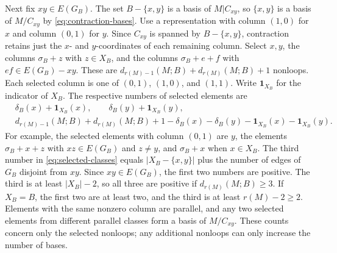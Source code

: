 \documentclass[11pt]{article}
\numberwithin{equation}{section}
\newcommand{\dloc}[1]{d_{#1}(M;B)}
\newcommand{\ind}{\mathbf 1}
\begin{document}
Next fix \(xy\in E(G_B)\). The set \(B-\{x,y\}\) is a basis
of \(M|C_{xy}\), so \(\{x,y\}\) is a basis of \(M/C_{xy}\)
by \eqref{eq:contraction-bases}.
Use a representation with column \((1,0)\) for \(x\)
and column \((0,1)\) for \(y\). Since \(C_{xy}\) is spanned
by \(B-\{x,y\}\), contraction retains just the \(x\)- and
\(y\)-coordinates of each remaining column.
Select \(x,y\), the columns \(\sigma_B+z\) with \(z\in X_B\),
and the columns \(\sigma_B+e+f\) with \(ef\in E(G_B)-xy\). These are
\(\dloc{r(M)-1}+\dloc{r(M)}+1\) nonloops. Each selected column is one of
\((0,1)\), \((1,0)\), and \((1,1)\).
Write \(\ind_{X_B}\) for the indicator of \(X_B\).
The respective numbers of selected elements are
\begin{equation}\label{eq:selected-classes}
\begin{split}
 &\delta_B(x)+\ind_{X_B}(x),\qquad
 \delta_B(y)+\ind_{X_B}(y),\\
 &\dloc{r(M)-1}+\dloc{r(M)}+1
 -\delta_B(x)-\delta_B(y)-\ind_{X_B}(x)-\ind_{X_B}(y).
\end{split}
\end{equation}
For example, the selected elements with column \((0,1)\) are \(y\),
the elements \(\sigma_B+x+z\) with \(xz\in E(G_B)\) and \(z\ne y\),
and \(\sigma_B+x\) when \(x\in X_B\).
The third number in \eqref{eq:selected-classes} equals
\(|X_B-\{x,y\}|\) plus the number of edges of \(G_B\) disjoint from \(xy\).
Since \(xy\in E(G_B)\), the first two numbers are positive.
The third is at least \(|X_B|-2\), so all three are positive if
\(\dloc{r(M)}\ge3\). If \(X_B=B\), the first two are at least two,
and the third is at least \(r(M)-2\ge2\).
Elements with the same nonzero column are parallel, and any two
selected elements from different parallel classes form a basis
of \(M/C_{xy}\). These counts concern only the selected
nonloops; any additional nonloops can only increase the number of bases.
\end{document}
